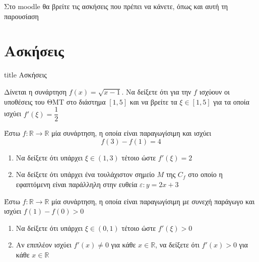 \documentclass{presentation}
\begin{document}
\begin{frame}
    Στο moodle θα βρείτε τις ασκήσεις που πρέπει να κάνετε, όπως και αυτή τη παρουσίαση
\end{frame}

\section{Ασκήσεις}

\begin{frame}[noframenumbering]
    \vfill
    \centering
    \begin{beamercolorbox}[sep=8pt,center,shadow=true,rounded=true]{title}
        Ασκήσεις
    \end{beamercolorbox}
    \vfill
\end{frame}

\begin{askisi}
    Δίνεται η συνάρτηση $f(x)=\sqrt{x-1}$. Να δείξετε ότι για την $f$ ισχύουν οι υποθέσεις του ΘΜΤ στο διάστημα $[1,5]$ και να βρείτε τα $ξ\in [1,5]$ για τα οποία ισχύει $f'(ξ)=\dfrac{1}{2}$

\end{askisi}

\begin{askisi}
    Έστω $f:\mathbb{R}\to\mathbb{R}$ μία συνάρτηση, η οποία είναι παραγωγίσιμη και ισχύει
    $$f(3)-f(1)=4$$
    \begin{enumerate}
        \item<1-> Να δείξετε ότι υπάρχει $ξ\in (1,3)$ τέτοιο ώστε $f'(ξ)=2$
        \item<2-> Να δείξετε ότι υπάρχει ένα τουλάχιστον σημείο $Μ$ της $C_f$ στο οποίο η εφαπτόμενη είναι παράλληλη στην ευθεία $ε:y=2x+3$
    \end{enumerate}

\end{askisi}

\begin{askisi}
    Έστω $f:\mathbb{R}\to\mathbb{R}$ μία συνάρτηση, η οποία είναι παραγωγίσιμη με συνεχή παράγωγο και ισχύει $f(1)-f(0)>0$
    \begin{enumerate}
        \item<1-> Να δείξετε ότι υπάρχει $ξ\in (0,1)$ τέτοιο ώστε $f'(ξ)>0$
        \item<2-> Αν επιπλέον ισχύει $f'(x)\ne 0$ για κάθε $x\in\mathbb{R}$, να δείξετε ότι $f'(x)>0$ για κάθε $x\in\mathbb{R}$
    \end{enumerate}

\end{askisi}
\end{document}
